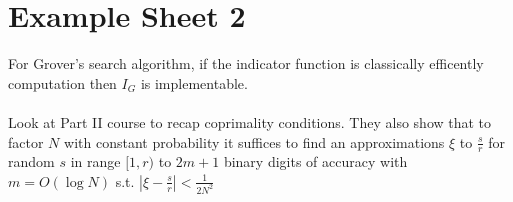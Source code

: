 \documentclass{article}
\begin{document}
                               \section{Example Sheet 2}
For Grover's search algorithm, if the indicator function is classically efficently computation then $I_G$ is implementable.\\\\
Look at Part II course to recap coprimality conditions. They also show that to factor $N$ with constant probability it suffices to find an approximations $\xi$ to $\frac{s}{r}$ for random $s$ in range $[1,r)$ to $2m+1$ binary digits of accuracy with $m= O(\log N)$ s.t. $| \xi - \frac{s}{r} | < \frac{1}{2N^2}$\\\\
                       
\end{document}
